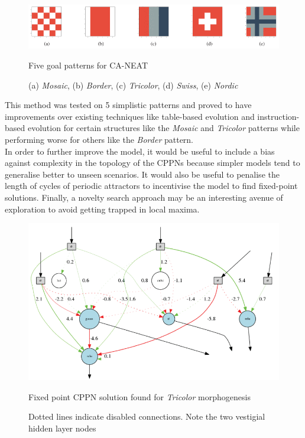 \begin{figure}[!h]
    \centering
    \includegraphics[width=5in]{images/five-flags.png}
    \caption{Five goal patterns for CA-NEAT}
    \caption*{(a) \textit{Mosaic}, (b) \textit{Border}, (c) \textit{Tricolor}, (d) \textit{Swiss}, (e) \textit{Nordic}}
    \label{fig:five-flags}
\end{figure}

This method was tested on 5 simplistic patterns and proved to have improvements over existing techniques like table-based evolution and instruction-based evolution \cite{nichele2014evolutionary} for certain structures like the \textit{Mosaic} and \textit{Tricolor} patterns while performing worse for others like the \textit{Border} pattern.\\

In order to further improve the model, it would be useful to include a bias against complexity in the topology of the CPPNs because simpler models tend to generalise better to unseen scenarios.
It would also be useful to penalise the length of cycles of periodic attractors to incentivise the model to find fixed-point solutions.
Finally, a novelty search approach may be an interesting avenue of exploration to avoid getting trapped in local maxima.

\begin{figure}[!h]
    \centering
    \includegraphics[width=5in]{images/tricolor-cppn.png}
    \caption{Fixed point CPPN solution found for \textit{Tricolor} morphogenesis}
    \caption*{Dotted lines indicate disabled connections. Note the two vestigial hidden layer nodes}
    \label{fig:tricolor-cppn}
\end{figure}


